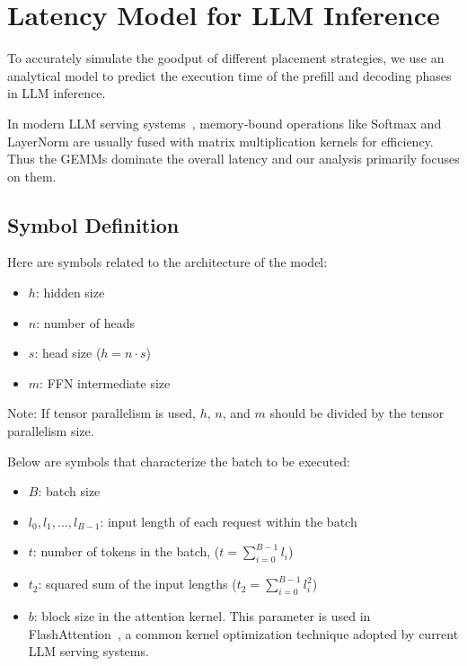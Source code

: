 \newpage
\appendix

\section{Latency Model for LLM Inference}
\label{appendix:latency_model}

To accurately simulate the goodput of different placement strategies, we use an analytical model to predict the execution time of the prefill and decoding phases in LLM inference. 

In modern LLM serving systems~\cite{fastertransformer, vllm, wu2023fast}, memory-bound operations like Softmax and LayerNorm are usually fused with matrix multiplication kernels for efficiency. Thus the GEMMs dominate the overall latency and our analysis primarily focuses on them. 

\subsection{Symbol Definition}

Here are symbols related to the architecture of the model:

\begin{itemize}
    \item $h$: hidden size
    \item $n$: number of heads
    \item $s$: head size ($h = n \cdot s$)
    \item $m$: FFN intermediate size
\end{itemize}

Note: If tensor parallelism is used, $h$, $n$, and $m$ should be divided by the tensor parallelism size.

Below are symbols that characterize the batch to be executed:

\begin{itemize}
    \item $B$: batch size
    \item $l_0, l_1, \dots, l_{B-1}$: input length of each request within the batch
    \item $t$: number of tokens in the batch, ($t = \sum_{i=0}^{B-1} l_i$)
    \item $t_2$: squared sum of the input lengths ($t_2 = \sum_{i=0}^{B-1} l_i^2$)
    \item $b$: block size in the attention kernel. This parameter is used in FlashAttention~\cite{dao2022flashattention}, a common kernel optimization technique adopted by current LLM serving systems.
\end{itemize}


